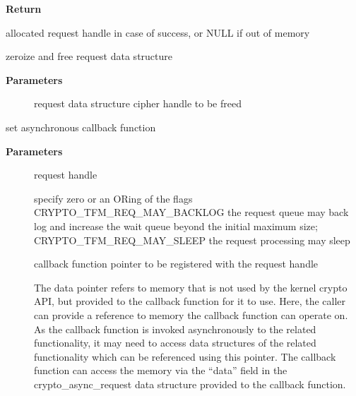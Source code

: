 \documentclass[a4paper,8pt,english]{sphinxmanual}
\begin{document}
\textbf{Return}

allocated request handle in case of success, or NULL if out of memory

\begin{fulllineitems}
\label{crypto/api-aead:c.aead_request_free}
zeroize and free request data structure

\end{fulllineitems}


\textbf{Parameters}
\begin{description}
\item[{}] \leavevmode
request data structure cipher handle to be freed

\end{description}

\begin{fulllineitems}
\label{crypto/api-aead:c.aead_request_set_callback}
set asynchronous callback function

\end{fulllineitems}


\textbf{Parameters}
\begin{description}
\item[{}] \leavevmode
request handle

\item[{}] \leavevmode
specify zero or an ORing of the flags
CRYPTO\_TFM\_REQ\_MAY\_BACKLOG the request queue may back log and
increase the wait queue beyond the initial maximum size;
CRYPTO\_TFM\_REQ\_MAY\_SLEEP the request processing may sleep

\item[{}] \leavevmode
callback function pointer to be registered with the request handle

\item[{}] \leavevmode
The data pointer refers to memory that is not used by the kernel
crypto API, but provided to the callback function for it to use. Here,
the caller can provide a reference to memory the callback function can
operate on. As the callback function is invoked asynchronously to the
related functionality, it may need to access data structures of the
related functionality which can be referenced using this pointer. The
callback function can access the memory via the ``data'' field in the
crypto\_async\_request data structure provided to the callback function.

\end{description}
\end{document}
